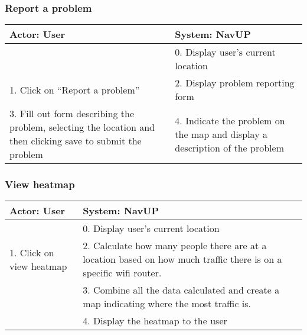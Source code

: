 \documentclass[12pt,a4paper]{article}
\begin{document}
		\subsubsection {Report a problem}
		\begin{tabular}{|p{7cm}|p{7cm}|}
			\hline
			\textbf{Actor: User} & \textbf{System: NavUP}\\
			\hline
			 & 0. Display user’s current location\\
			\hline
			1. Click on “Report a problem” & 2. Display problem reporting form \\
			\hline
			3. Fill out form describing the problem, selecting the location and then clicking save to submit the problem & 4. Indicate the problem on the map and display a description of the problem\\
			\hline
		\end{tabular}
		\subsubsection {View heatmap}
		\begin{tabular}{|p{7cm}|p{7cm}|}
			\hline
			\textbf{Actor: User} & \textbf{System: NavUP}\\
			\hline
			 & 0. Display user’s current location\\
			\hline
			1. Click on view heatmap & 2. Calculate how many people there are at a location based on how much traffic there is on a specific wifi router. \\
			\hline
			 & 3. Combine all the data calculated and create a map indicating where the most traffic is.\\
			\hline
			& 4. Display the heatmap to the user\\
			\hline
		\end{tabular}
\end{document}

